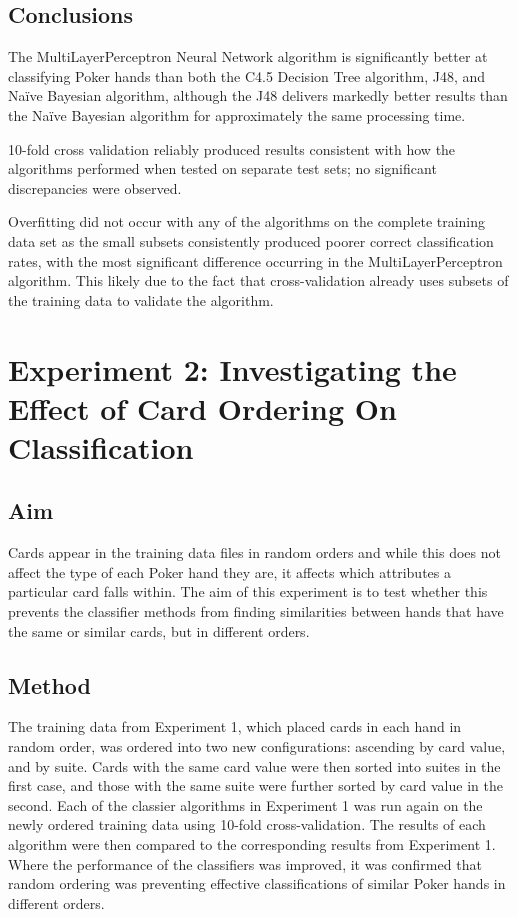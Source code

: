\documentclass[10pt, a4paper]{article}
\begin{document}
\subsection*{Conclusions}

The MultiLayerPerceptron Neural Network algorithm is significantly better at classifying Poker hands than both the C4.5 Decision Tree algorithm, J48, and Na\"ive Bayesian algorithm, although the J48 delivers markedly better results than the Na\"ive Bayesian algorithm for approximately the same processing time.

10-fold cross validation reliably produced results consistent with how the algorithms performed when tested on separate test sets; no significant discrepancies were observed. 

Overfitting did not occur with any of the algorithms on the complete training data set as the small subsets consistently produced poorer correct classification rates, with the most significant difference occurring in the MultiLayerPerceptron algorithm. This likely due to the fact that cross-validation already uses subsets of the training data to validate the algorithm.


\section*{Experiment 2: Investigating the Effect of Card Ordering On Classification}

\subsection*{Aim}

Cards appear in the training data files in random orders and while this does not affect the type of each Poker hand they are, it affects which attributes a particular card falls within. The aim of this experiment is to test whether this prevents the classifier methods from finding similarities between hands that have the same or similar cards, but in different orders.

\subsection*{Method}

The training data from Experiment 1, which placed cards in each hand in random order, was ordered into two new configurations: ascending by card value, and by suite. Cards with the same card value were then sorted into suites in the first case, and those with the same suite were further sorted by card value in the second. Each of the classier algorithms in Experiment 1 was run again on the newly ordered training data using 10-fold cross-validation. The results of each algorithm were then compared to the corresponding results from Experiment 1. Where the performance of the classifiers was improved, it was confirmed that random ordering was preventing effective classifications of similar Poker hands in different orders.
\end{document}
